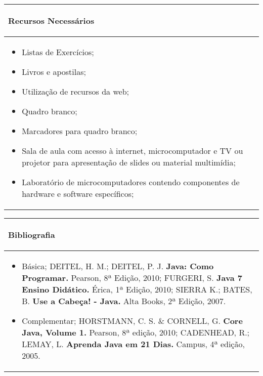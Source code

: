 \begin{table}[h!]
\centering
\begin{small} 
 
\setlength{\tabcolsep}{3pt} 
\begin{tabular}{|p{15cm}|}\hline

\begin{center}\textbf{Recursos Necessários}\end{center}\\ \hline
\begin{itemize} 
  \item Listas de Exercícios;
  \item Livros e apostilas;
  \item Utilização de recursos da web;
  \item Quadro branco;
  \item Marcadores para quadro branco;
  \item Sala de aula com acesso à internet, microcomputador e TV ou projetor para apresentação de slides ou material multimídia;
  \item Laboratório de microcomputadores contendo componentes de hardware e software específicos;
\end{itemize}
 \\ \hline

\end{tabular} 
\end{small}
\label{dadosinstituicao}
\end{table}


\begin{table}[h!]
\centering
\begin{small} 
\setlength{\tabcolsep}{3pt} 
\begin{tabular}{|p{15cm}|}\hline

\begin{center}\textbf{Bibliografia}\end{center}\\ \hline
\begin{itemize} 
  \item Básica;
  	\newline DEITEL, H. M.; DEITEL, P. J. \textbf{Java: Como Programar.} Pearson, 8ª Edição, 2010;
	\newline FURGERI, S. \textbf{Java 7 Ensino Didático.} Érica, 1ª Edição, 2010;
	\newline SIERRA K.; BATES, B. \textbf{Use a Cabeça! - Java.} Alta Books, 2ª Edição, 2007.
  \item Complementar;
  	\newline HORSTMANN, C. S. \& CORNELL, G. \textbf{Core Java, Volume 1.} Pearson, 8ª edição, 2010;
	\newline CADENHEAD, R.; LEMAY, L. \textbf{Aprenda Java em 21 Dias.} Campus, 4ª edição, 2005.
  
\end{itemize}
 \\ \hline

\end{tabular} 
\end{small}
\label{dadosinstituicao}
\end{table}


